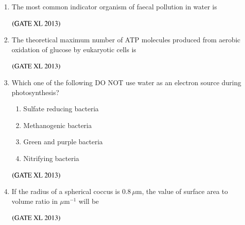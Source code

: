 \documentclass[journal]{IEEEtran}
\begin{document}
\begin{enumerate}
\begin{enumerate}[label=\arabic*.]
\item The most common indicator organism of faecal pollution in water is
\begin{enumerate}
\end{enumerate}
\hfill $\left(\text{GATE XL 2013}\right)$

\item The theoretical maximum number of ATP molecules produced from aerobic oxidation of glucose by eukaryotic cells is
\begin{enumerate}
\end{enumerate}
\hfill $\left(\text{GATE XL 2013}\right)$

\item Which one of the following DO NOT use water as an electron source during photosynthesis?
\begin{enumerate}
\item Sulfate reducing bacteria
\item Methanogenic bacteria
\item Green and purple bacteria
\item Nitrifying bacteria
\end{enumerate}
\hfill $\left(\text{GATE XL 2013}\right)$

\item If the radius of a spherical coccus is $0.8\,\mu\text{m}$, the value of surface area to volume ratio in $\mu\text{m}^{-1}$ will be
\begin{enumerate}
\end{enumerate}
\hfill $\left(\text{GATE XL 2013}\right)$


\end{enumerate}
\end{enumerate}
\end{document}
